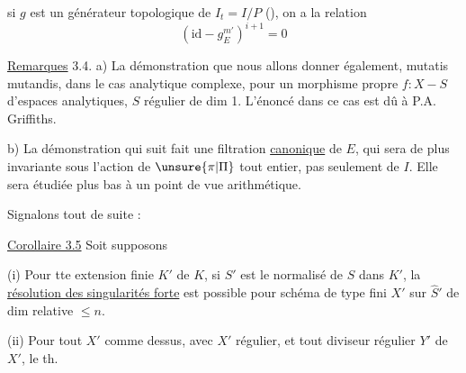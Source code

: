 
si $g$ est un générateur topologique de $I_t=I/P$ (),  on a la relation
\[
(\mathrm{id}-g_E^{m'})^{i+1}=0
\tag*{(3.3)}
\]

\uline{Remarques} 3.4. a) La démonstration que nous allons donner   également, mutatis mutandis, dans le cas analytique complexe, pour un morphisme propre $f:X\mathbin{-}S$ d'espaces analytiques, $S$ régulier de dim 1.  L'énoncé dans ce cas est dû à P.A. Griffiths.

b) La démonstration qui suit   fait une filtration \uline{canonique} de $E$, qui sera de plus invariante sous l'action de $\unsure{\pi|\Pi}$ tout entier, pas seulement de $I$. Elle sera étudiée plus bas à un point de vue arithmétique.

Signalons tout de suite :

\uline{Corollaire 3.5}  Soit    supposons 

(i) Pour tte extension finie $K'$ de $K$, si $S'$ est le normalisé de $S$ dans $K'$, la \uline{résolution des singularités forte} est possible pour  schéma de type fini $X'$ sur $\hat S'$ de dim relative $\leq n$.

(ii) Pour tout  $X'$ comme dessus, avec $X'$ régulier, et tout diviseur régulier $Y'$ de $X'$, le th.
